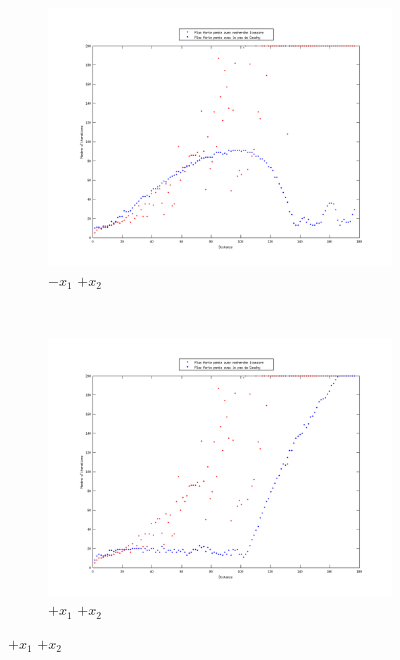 \documentclass[11pt,a4paper,twoside,onecolumn,titlepage]{report}
\begin{document}
\begin{enumerate}[(a)]
\begin{figure}[h!]
    \centering
	\begin{subfigure}[t]{0.5\textwidth}
		\centering
		\includegraphics[scale=0.4]{steps-quarter-4}
		\caption{$-x_1$ $+x_2$}
		\label{fig:rlVSqnQ4}
	\end{subfigure}%
        ~ %
    \begin{subfigure}[t]{0.5\textwidth}
		\centering
		\includegraphics[scale=0.4]{steps-quarter-3}
		\caption{$+x_1$ $+x_2$}
		\label{fig:fig:rlVSqnQ3}
	\end{subfigure}


\end{figure}
\end{enumerate}
\end{document}
